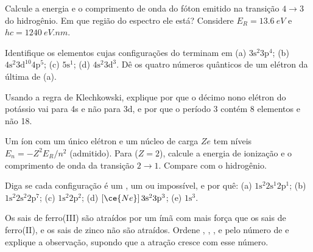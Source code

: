 \begin{exercise}[$\star\star$]\label{exo:b1:quantum-numbers:7}
Calcule a energia e o comprimento de onda do fóton emitido na
transição $4 \to 3$ do hidrogênio. Em que região do espectro ele está?
Considere $E_R = \qty{13.6}{eV}$ e $hc = \qty{1240}{eV.nm}$.
\end{exercise}

\begin{exercise}[$\star\star$]\label{exo:b1:quantum-numbers:8}
Identifique os elementos cujas configurações do  terminam em
(a) $3\text{s}^2 3\text{p}^4$; (b) $4\text{s}^2 3\text{d}^{10} 4\text{p}^5$;
(c) $5\text{s}^1$; (d) $4\text{s}^2 3\text{d}^3$. Dê os quatro números
quânticos de um elétron da última  de (a).
\end{exercise}

\begin{exercise}[$\star\star$]\label{exo:b1:quantum-numbers:9}
Usando a regra de Klechkowski, explique por que o décimo nono elétron do
potássio vai para 4s e não para 3d, e por que o período 3 contém 8
elementos e não 18.
\end{exercise}

\begin{exercise}[$\star\star\star$]\label{exo:b1:quantum-numbers:10}
Um íon com um único elétron e um núcleo de carga $Ze$ tem níveis
$E_n = -Z^2 E_R/n^2$ (admitido). Para  ($Z = 2$), calcule a
energia de ionização e o comprimento de onda da transição $2 \to 1$.
Compare com o hidrogênio.
\end{exercise}

\begin{exercise}[$\star\star\star$]\label{exo:b1:quantum-numbers:11}
Diga se cada configuração é um , um  ou
impossível, e por quê: (a) $1\text{s}^2 2\text{s}^1 2\text{p}^1$;
(b) $1\text{s}^2 2\text{s}^2 2\text{p}^7$; (c) $1\text{s}^2 2\text{p}^2$;
(d) $[\ce{Ne}]\,3\text{s}^2 3\text{p}^3$; (e) $1\text{s}^3$.
\end{exercise}

\begin{exercise}[$\star\star\star$]\label{exo:b1:quantum-numbers:12}
Os sais de ferro(III) são atraídos por um ímã com mais força que os sais
de ferro(II), e os sais de zinco não são atraídos. Ordene , ,
,  e  pelo número de  e explique a observação, supondo que a atração cresce
com esse número.
\end{exercise}

